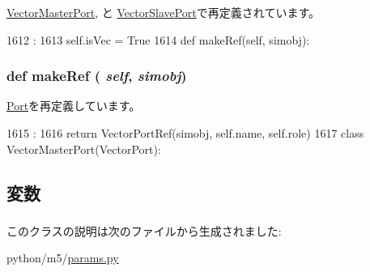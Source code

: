 \hyperlink{classm5_1_1params_1_1VectorMasterPort_ac775ee34451fdfa742b318538164070e}{VectorMasterPort}, と \hyperlink{classm5_1_1params_1_1VectorSlavePort_ac775ee34451fdfa742b318538164070e}{VectorSlavePort}で再定義されています。


\begin{DoxyCode}
1612                              :
1613         self.isVec = True
1614 
    def makeRef(self, simobj):
\end{DoxyCode}
\hypertarget{classm5_1_1params_1_1VectorPort_a0170489846d992db3fea03df9156216b}{
\subsubsection[{makeRef}]{\setlength{\rightskip}{0pt plus 5cm}def makeRef ( {\em self}, \/   {\em simobj})}}
\label{classm5_1_1params_1_1VectorPort_a0170489846d992db3fea03df9156216b}


\hyperlink{classm5_1_1params_1_1Port_a0170489846d992db3fea03df9156216b}{Port}を再定義しています。


\begin{DoxyCode}
1615                              :
1616         return VectorPortRef(simobj, self.name, self.role)
1617 
class VectorMasterPort(VectorPort):
\end{DoxyCode}


\subsection{変数}
\hypertarget{classm5_1_1params_1_1VectorPort_a7af47132c5fb2b2cc33a809a92e51553}{
\subsubsection[{isVec}]{}}
\label{classm5_1_1params_1_1VectorPort_a7af47132c5fb2b2cc33a809a92e51553}


このクラスの説明は次のファイルから生成されました:\begin{DoxyCompactItemize}
\item 
python/m5/\hyperlink{params_8py}{params.py}\end{DoxyCompactItemize}
